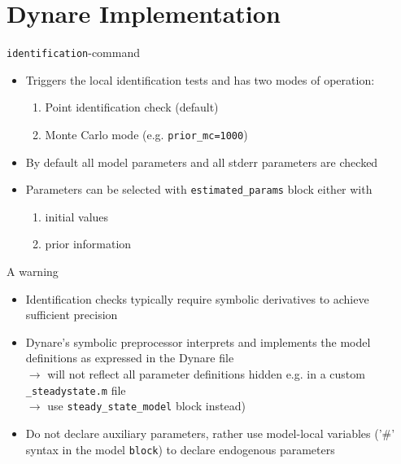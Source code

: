 \section{Dynare Implementation}
\begin{frame}{\texttt{identification}-command}

\begin{itemize}
\item Triggers the local identification tests and has two modes of operation:
\begin{enumerate}
 \item Point identification check (default)
 \item Monte Carlo mode (e.g. \texttt{prior\_mc=1000})
\end{enumerate}
\item By default all model parameters and all stderr parameters are checked
\item Parameters can be selected with \texttt{estimated\_params} block either with
\begin{enumerate}
\item  initial values
\item  prior information
\end{enumerate}
\end{itemize}
\end{frame}

\begin{frame}{A warning}

\begin{itemize}
\item Identification checks typically require symbolic derivatives to achieve sufficient precision
\item Dynare's symbolic preprocessor interprets and implements the model definitions as expressed in the Dynare file\\
$\rightarrow$ will not reflect all parameter definitions hidden e.g. in a custom \texttt{\_steadystate.m} file \\
$\rightarrow$ use \texttt{steady\_state\_model} block instead)
\item Do not declare auxiliary parameters, rather use model-local variables ('\#' syntax in the
model \texttt{block}) to declare endogenous parameters
\end{itemize}
\end{frame}

